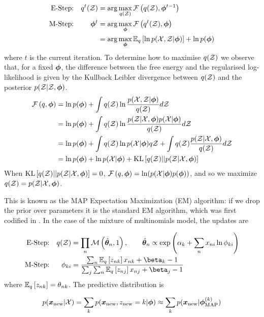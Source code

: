 \begin{align*}
\text{E-Step:} & & q^t(\zdat) & = \arg \max_{q(\zdat)} \fqt{q(\zdat), \param^{t-1}} \\
\text{M-Step:} & & \param^t & = \arg \max_{\param} \fqt{q^t(\zdat), \param} \\
& & & = \arg \max_{\param} \ex{\ln p(\xdat, \zdat | \param)}{q} + \ln p(\param)
\end{align*}
where $t$ is the current iteration. To determine how to maximise $q(\zdat)$ we observe that, for a fixed $\param$, the difference between the free energy and the regularised log-likelihood is given by the Kullback Leibler divergence between $q(\zdat)$ and the posterior $p(\zdat|\zdat, \param)$.
\begin{align*}
\fqt{q, \param} 
& = \ln p(\param) + \int q(\zdat) \ln \frac{p(\xdat, \zdat|\param)}{q(\zdat)} d\zdat \\
& = \ln p(\param) + \int q(\zdat) \ln \frac{p(\zdat|\xdat, \param)p(\xdat | \param)}{q(\zdat)} d\zdat \\
& = \ln p(\param) + \int q(\zdat) \ln p(\xdat | \param) q\zdat + \int q(\zdat)\frac{p(\zdat|\xdat, \param)}{q(\zdat)} d\zdat \\
& = \ln p(\param) + \ln p(\xdat | \param) + \kl{q(\zdat)}{p(\zdat|\xdat, \param)}
\end{align*}
When $\kl{q(\zdat)}{p(\zdat|\xdat, \param)} = 0$, $\fqt{q, \param} = \ln(p(\xdat | \param)p(\param))$, and so we maximize $q(\zdat) = p(\zdat | \xdat, \param)$.

This is known as the MAP Expectation Maximization (EM) algorithm: if we drop the prior over parameters it is the standard EM algorithm, which was first codified in \cite{Dempster1977}. In the case of the mixture of multinomials model, the updates are

\begin{align*}
\text{E-Step:} & & q(\zdat) & = \prod_n \muln{\hat{\vv{\theta}}_n}{1}, \qquad
\hat{\vv{\theta}}_n \propto \exp\left( \alpha_k + \sum_n x_{ni} \ln \phi_{ki} \right) \\
\text{M-Step:} & & \phi_{ki} & = \frac{\sum_n \ex{z_{nk}}{q} x_{nk} + \beta_k - 1}{\sum_j \sum_n \ex{z_{nj}}{q} x_{nj} + \beta_j - 1}
\end{align*}
where $\ex{z_{nk}}{q} = \theta_{nk}$. The predictive distribution is

\begin{align*}
p(\xnew | \xdat)  = \sum_k p(\xnew, z_{\text{new}} = k | \param) 
\approx \sum_k p(\xnew | \param^{(k)}_{\text{MAP}})
\end{align*}

